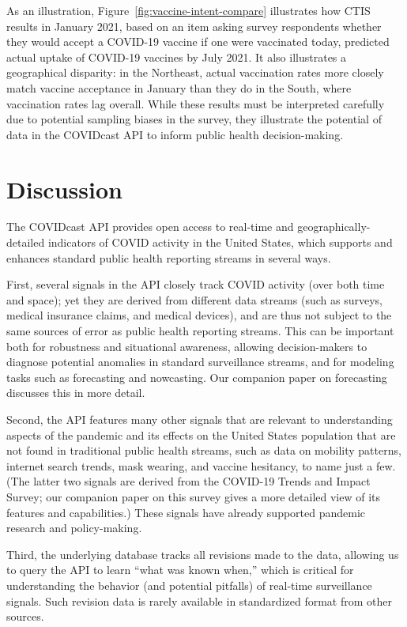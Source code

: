 \documentclass[9pt,twocolumn,twoside,lineno]{pnas-new}
\begin{document}
As an illustration, Figure~\ref{fig:vaccine-intent-compare} illustrates how
CTIS results in January 2021, based on an item asking survey respondents whether
they would accept a COVID-19 vaccine if one were vaccinated today, predicted
actual uptake of COVID-19 vaccines by July 2021. It also illustrates a
geographical disparity: in the Northeast, actual vaccination rates more closely
match vaccine acceptance in January than they do in the South, where vaccination
rates lag overall. While these results must be interpreted carefully due to
potential sampling biases in the survey, they illustrate the potential of data
in the COVIDcast API to inform public health decision-making.

\section{Discussion}

The COVIDcast API provides open access to real-time and geographically-detailed
indicators of COVID activity in the United States, which supports and enhances
standard public health reporting streams in several ways.

First, several signals in the API closely track COVID activity (over both time
and space); yet they are derived from different data streams (such as surveys,
medical insurance claims, and medical devices), and are thus not subject to the
same sources of error as public health reporting streams. This can be important
both for robustness and situational awareness, allowing decision-makers to
diagnose potential anomalies in standard surveillance streams, and for modeling
tasks such as forecasting and nowcasting. Our companion paper on forecasting
discusses this in more detail.

Second, the API features many other signals that are relevant to understanding
aspects of the pandemic and its effects on the United States population that are
not found in traditional public health streams, such as data on mobility
patterns, internet search trends, mask wearing, and vaccine hesitancy, to name
just a few. (The latter two signals are derived from the COVID-19 Trends and Impact
Survey; our companion paper on this survey gives a more detailed view of its
features and capabilities.) These signals have already supported pandemic
research and  policy-making.

Third, the underlying database tracks all revisions made to the data, allowing
us to query the API to learn ``what was known when,'' which is critical for
understanding the behavior (and potential pitfalls) of real-time surveillance
signals. Such revision data is rarely available in standardized format from
other sources.
\end{document}
